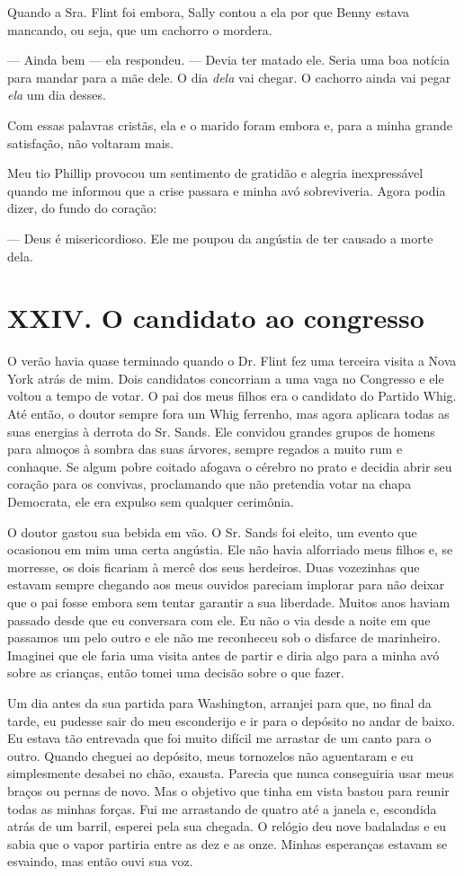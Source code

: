 Quando a Sra. Flint foi embora, Sally
contou a ela por que Benny estava mancando, ou seja, que um cachorro o
mordera.

--- Ainda bem --- ela respondeu. --- Devia ter matado ele. Seria uma boa
notícia para mandar para a mãe dele. O dia \emph{dela} vai chegar. O
cachorro ainda vai pegar \emph{ela} um dia desses.

Com essas palavras cristãs, ela e o marido foram embora e, para a minha
grande satisfação, não voltaram mais.

Meu tio Phillip provocou um sentimento
de gratidão e alegria inexpressável quando me informou que a crise
passara e minha avó sobreviveria. Agora podia dizer, do fundo do
coração:

--- Deus é misericordioso. Ele me poupou da angústia de ter causado a
morte dela.

\chapter{XXIV. O candidato ao
congresso}

O verão havia quase terminado quando o
Dr. Flint fez uma terceira visita a Nova York atrás de mim. Dois
candidatos concorriam a uma vaga no Congresso e ele voltou a tempo de
votar. O pai dos meus filhos era o candidato do Partido Whig. Até então,
o doutor sempre fora um Whig ferrenho, mas agora aplicara todas as suas
energias à derrota do Sr. Sands. Ele convidou grandes grupos de homens
para almoços à sombra das suas árvores, sempre regados a muito rum e
conhaque. Se algum pobre coitado afogava o cérebro no prato e decidia
abrir seu coração para os convivas, proclamando que não pretendia votar
na chapa Democrata, ele era expulso sem qualquer cerimônia.

O doutor gastou sua bebida em vão. O
Sr. Sands foi eleito, um evento que ocasionou em mim uma certa angústia.
Ele não havia alforriado meus filhos e, se morresse, os dois ficariam à
mercê dos seus herdeiros. Duas vozezinhas que estavam sempre chegando
aos meus ouvidos pareciam implorar para não deixar que o pai fosse
embora sem tentar garantir a sua liberdade. Muitos anos haviam passado
desde que eu conversara com ele. Eu não o via desde a noite em que
passamos um pelo outro e ele não me reconheceu sob o disfarce de
marinheiro. Imaginei que ele faria uma visita antes de partir e diria
algo para a minha avó sobre as crianças, então tomei uma decisão sobre o
que fazer.

Um dia antes da sua partida para
Washington, arranjei para que, no final da tarde, eu pudesse sair do meu
esconderijo e ir para o depósito no andar de baixo. Eu estava tão
entrevada que foi muito difícil me arrastar de um canto para o outro.
Quando cheguei ao depósito, meus tornozelos não aguentaram e eu
simplesmente desabei no chão, exausta. Parecia que nunca conseguiria
usar meus braços ou pernas de novo. Mas o objetivo que tinha em vista
bastou para reunir todas as minhas forças. Fui me arrastando de quatro
até a janela e, escondida atrás de um barril, esperei pela sua chegada.
O relógio deu nove badaladas e eu sabia que o vapor partiria entre as
dez e as onze. Minhas esperanças estavam se esvaindo, mas então ouvi sua
voz.

